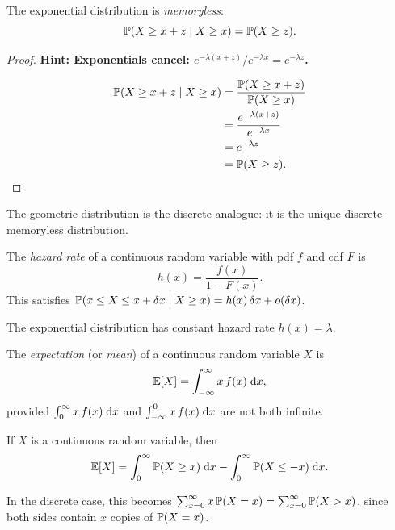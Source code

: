 \documentclass[a4paper]{article}
\begin{document}
\begin{prop}
  The exponential distribution is \emph{memoryless}:
  \[
    \P(X \geq x + z \mid X \geq x) = \P(X \geq z).
  \]
\end{prop}

\begin{proof}
  \textbf{Hint: Exponentials cancel: $e^{-\lambda(x+z)}/e^{-\lambda x} = e^{-\lambda z}$.}

  \begin{align*}
    \P(X \geq x + z \mid X \geq x) &= \frac{\P(X \geq x + z)}{\P(X \geq x)}\\
    &= \frac{e^{-\lambda(x + z)}}{e^{-\lambda x}}\\
    &= e^{-\lambda z}\\
    &= \P(X \geq z).\qedhere
  \end{align*}
\end{proof}

\begin{remark}
  The geometric distribution is the discrete analogue: it is the unique discrete memoryless distribution.
\end{remark}

\begin{defi}
  The \emph{hazard rate} of a continuous random variable with pdf $f$ and cdf $F$ is
  \[
    h(x) = \frac{f(x)}{1 - F(x)}.
  \]
  This satisfies $\P(x \leq X \leq x + \delta x \mid X \geq x) = h(x)\,\delta x + o(\delta x)$.
\end{defi}

\begin{remark}
  The exponential distribution has constant hazard rate $h(x) = \lambda$.
\end{remark}

\begin{defi}[Expectation]
  The \emph{expectation} (or \emph{mean}) of a continuous random variable $X$ is
  \[
    \E[X] = \int_{-\infty}^\infty x\,f(x)\;\d x,
  \]
  provided $\int_0^\infty x\,f(x)\;\d x$ and $\int_{-\infty}^0 x\,f(x)\;\d x$ are not both infinite.
\end{defi}

\begin{thm}
  If $X$ is a continuous random variable, then
  \[
    \E[X] = \int_0^\infty \P(X \geq x)\;\d x - \int_0^\infty \P(X \leq -x)\;\d x.
  \]
\end{thm}

\begin{remark}
  In the discrete case, this becomes $\sum_{x=0}^\infty x\,\P(X = x) = \sum_{x=0}^\infty \P(X > x)$, since both sides contain $x$ copies of $\P(X = x)$.
\end{remark}
\end{document}
